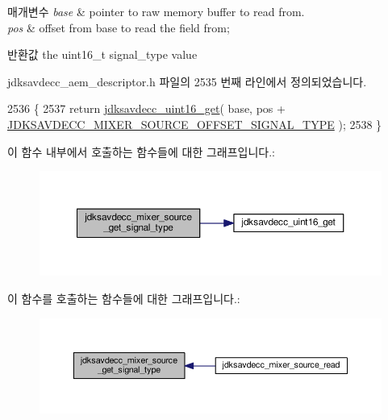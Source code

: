 \begin{DoxyParams}{매개변수}
{\em base} & pointer to raw memory buffer to read from. \\
\hline
{\em pos} & offset from base to read the field from; \\
\hline
\end{DoxyParams}
\begin{DoxyReturn}{반환값}
the uint16\+\_\+t signal\+\_\+type value 
\end{DoxyReturn}


jdksavdecc\+\_\+aem\+\_\+descriptor.\+h 파일의 2535 번째 라인에서 정의되었습니다.


\begin{DoxyCode}
2536 \{
2537     \textcolor{keywordflow}{return} \hyperlink{group__endian_ga3fbbbc20be954aa61e039872965b0dc9}{jdksavdecc\_uint16\_get}( base, pos + 
      \hyperlink{group__mixer__source_ga95968d5c7647c22a9b3a25974a845e4d}{JDKSAVDECC\_MIXER\_SOURCE\_OFFSET\_SIGNAL\_TYPE} );
2538 \}
\end{DoxyCode}


이 함수 내부에서 호출하는 함수들에 대한 그래프입니다.\+:
\nopagebreak
\begin{figure}[H]
\begin{center}
\leavevmode
\includegraphics[width=350pt]{group__mixer__source_ga4996aa8dd2c0e86703304f4bbafaf910_cgraph}
\end{center}
\end{figure}




이 함수를 호출하는 함수들에 대한 그래프입니다.\+:
\nopagebreak
\begin{figure}[H]
\begin{center}
\leavevmode
\includegraphics[width=350pt]{group__mixer__source_ga4996aa8dd2c0e86703304f4bbafaf910_icgraph}
\end{center}
\end{figure}


